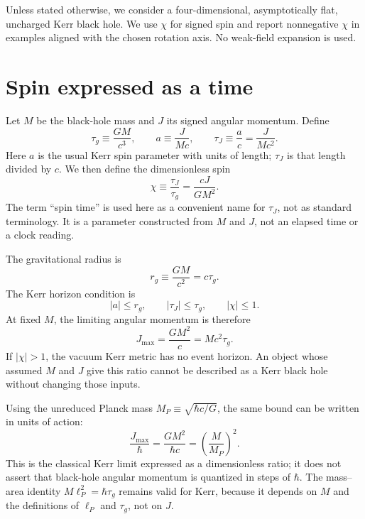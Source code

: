 \documentclass[12pt]{article}
\begin{document}
Unless stated otherwise, we consider a four-dimensional, asymptotically flat, uncharged Kerr black hole. We use $\chi$ for signed spin and report nonnegative $\chi$ in examples aligned with the chosen rotation axis. No weak-field expansion is used.

\section{Spin expressed as a time}

Let $M$ be the black-hole mass and $J$ its signed angular momentum. Define
\begin{equation}
  \tau_g\equiv\frac{GM}{c^3},
  \qquad
  a\equiv\frac{J}{Mc},
  \qquad
  \tau_J\equiv\frac{a}{c}=\frac{J}{Mc^2}.
  \label{eq:spin-times}
\end{equation}
Here $a$ is the usual Kerr spin parameter with units of length; $\tau_J$ is that length divided by $c$. We then define the dimensionless spin
\begin{equation}
  \chi\equiv\frac{\tau_J}{\tau_g}
  =\frac{cJ}{GM^2}.
  \label{eq:dimensionless-spin}
\end{equation}
The term ``spin time'' is used here as a convenient name for $\tau_J$, not as standard terminology. It is a parameter constructed from $M$ and $J$, not an elapsed time or a clock reading.

The gravitational radius is
\begin{equation}
  r_g\equiv\frac{GM}{c^2}=c\tau_g.
  \label{eq:gravitational-radius}
\end{equation}
The Kerr horizon condition is
\begin{equation}
  |a|\leq r_g,
  \qquad
  |\tau_J|\leq\tau_g,
  \qquad
  |\chi|\leq1.
  \label{eq:kerr-bound}
\end{equation}
At fixed $M$, the limiting angular momentum is therefore
\begin{equation}
  J_{\max}=\frac{GM^2}{c}=Mc^2\tau_g.
  \label{eq:max-angular-momentum}
\end{equation}
If $|\chi|>1$, the vacuum Kerr metric has no event horizon. An object whose assumed $M$ and $J$ give this ratio cannot be described as a Kerr black hole without changing those inputs.

Using the unreduced Planck mass $M_P\equiv\sqrt{\hbar c/G}$, the same bound can be written in units of action:
\begin{equation}
  \frac{J_{\max}}{\hbar}
  =\frac{GM^2}{\hbar c}
  =\left(\frac{M}{M_P}\right)^2.
  \label{eq:planck-spin-limit}
\end{equation}
This is the classical Kerr limit expressed as a dimensionless ratio; it does not assert that black-hole angular momentum is quantized in steps of $\hbar$. The mass--area identity $M\ell_P^2=\hbar\tau_g$ remains valid for Kerr, because it depends on $M$ and the definitions of $\ell_P$ and $\tau_g$, not on $J$.
\end{document}

